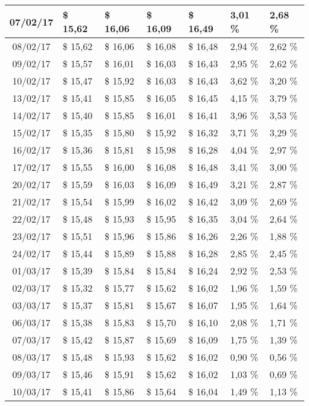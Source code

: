 \begin{center}
\begin{longtable}{|c|p{1.5cm}|p{1.5cm}|p{1.5cm}|p{1.5cm}|p{1.5cm}|p{1.5cm}|}
07/02/17 & \$ 15,62 & \$ 16,06 & \$ 16,09 & \$ 16,49 & 3,01 \% & 2,68 \% \\ \hline
08/02/17 & \$ 15,62 & \$ 16,06 & \$ 16,08 & \$ 16,48 & 2,94 \% & 2,62 \% \\ \hline
09/02/17 & \$ 15,57 & \$ 16,01 & \$ 16,03 & \$ 16,43 & 2,95 \% & 2,62 \% \\ \hline
10/02/17 & \$ 15,47 & \$ 15,92 & \$ 16,03 & \$ 16,43 & 3,62 \% & 3,20 \% \\ \hline
13/02/17 & \$ 15,41 & \$ 15,85 & \$ 16,05 & \$ 16,45 & 4,15 \% & 3,79 \% \\ \hline
14/02/17 & \$ 15,40 & \$ 15,85 & \$ 16,01 & \$ 16,41 & 3,96 \% & 3,53 \% \\ \hline
15/02/17 & \$ 15,35 & \$ 15,80 & \$ 15,92 & \$ 16,32 & 3,71 \% & 3,29 \% \\ \hline
16/02/17 & \$ 15,36 & \$ 15,81 & \$ 15,98 & \$ 16,28 & 4,04 \% & 2,97 \% \\ \hline
17/02/17 & \$ 15,55 & \$ 16,00 & \$ 16,08 & \$ 16,48 & 3,41 \% & 3,00 \% \\ \hline
20/02/17 & \$ 15,59 & \$ 16,03 & \$ 16,09 & \$ 16,49 & 3,21 \% & 2,87 \% \\ \hline
21/02/17 & \$ 15,54 & \$ 15,99 & \$ 16,02 & \$ 16,42 & 3,09 \% & 2,69 \% \\ \hline
22/02/17 & \$ 15,48 & \$ 15,93 & \$ 15,95 & \$ 16,35 & 3,04 \% & 2,64 \% \\ \hline
23/02/17 & \$ 15,51 & \$ 15,96 & \$ 15,86 & \$ 16,26 & 2,26 \% & 1,88 \% \\ \hline
24/02/17 & \$ 15,44 & \$ 15,89 & \$ 15,88 & \$ 16,28 & 2,85 \% & 2,45 \% \\ \hline
01/03/17 & \$ 15,39 & \$ 15,84 & \$ 15,84 & \$ 16,24 & 2,92 \% & 2,53 \% \\ \hline
02/03/17 & \$ 15,32 & \$ 15,77 & \$ 15,62 & \$ 16,02 & 1,96 \% & 1,59 \% \\ \hline
03/03/17 & \$ 15,37 & \$ 15,81 & \$ 15,67 & \$ 16,07 & 1,95 \% & 1,64 \% \\ \hline
06/03/17 & \$ 15,38 & \$ 15,83 & \$ 15,70 & \$ 16,10 & 2,08 \% & 1,71 \% \\ \hline
07/03/17 & \$ 15,42 & \$ 15,87 & \$ 15,69 & \$ 16,09 & 1,75 \% & 1,39 \% \\ \hline
08/03/17 & \$ 15,48 & \$ 15,93 & \$ 15,62 & \$ 16,02 & 0,90 \% & 0,56 \% \\ \hline
09/03/17 & \$ 15,46 & \$ 15,91 & \$ 15,62 & \$ 16,02 & 1,03 \% & 0,69 \% \\ \hline
10/03/17 & \$ 15,41 & \$ 15,86 & \$ 15,64 & \$ 16,04 & 1,49 \% & 1,13 \% \\ \hline

\end{longtable}
\end{center}
